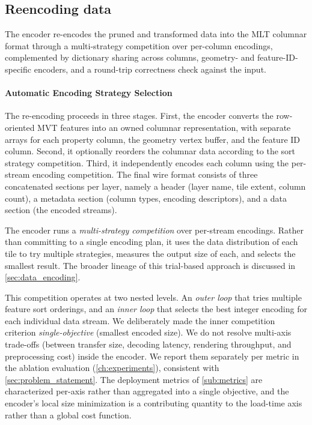 \subsection{Reencoding data}

The encoder re-encodes the pruned and transformed data into the \ac{MLT} columnar format through a multi-strategy competition over per-column encodings, complemented by dictionary sharing across columns, geometry- and feature-ID-specific encoders, and a round-trip correctness check against the input.

\paragraph{Automatic Encoding Strategy Selection}\label{sub:encoding_strategies}
The re-encoding proceeds in three stages.
First, the encoder converts the row-oriented \ac{MVT} features into an owned columnar representation, with separate arrays for each property column, the geometry vertex buffer, and the feature ID column.
Second, it optionally reorders the columnar data according to the sort strategy competition.
Third, it independently encodes each column using the per-stream encoding competition.
The final wire format consists of three concatenated sections per layer, namely a header (layer name, tile extent, column count), a metadata section (column types, encoding descriptors), and a data section (the encoded streams).

The encoder runs a \emph{multi-strategy competition} over per-stream encodings.
Rather than committing to a single encoding plan, it uses the data distribution of each tile to try multiple strategies, measures the output size of each, and selects the smallest result.
The broader lineage of this trial-based approach is discussed in \cref{sec:data_encoding}.

This competition operates at two nested levels.
An \emph{outer loop} that tries multiple feature sort orderings, and an \emph{inner loop} that selects the best integer encoding for each individual data stream.
We deliberately made the inner competition criterion \emph{single-objective} (smallest encoded size).
We do not resolve multi-axis trade-offs (between transfer size, decoding latency, rendering throughput, and preprocessing cost) inside the encoder.
We report them separately per metric in the ablation evaluation (\cref{ch:experiments}), consistent with \cref{sec:problem_statement}.
The deployment metrics of \cref{sub:metrics} are characterized per-axis rather than aggregated into a single objective, and the encoder's local size minimization is a contributing quantity to the load-time axis rather than a global cost function.

